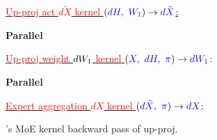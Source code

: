\begin{figure}
\vspace{-3em}
\begin{minipage}{0.35\textwidth}

\begin{algorithm}[H]
    \caption{\Algname's MoE kernel backward pass of up-proj.}
    \DontPrintSemicolon
    \label{alg:up-bwd-moe}
     \fontsize{8pt}{9pt}\selectfont
    
    
    
    \underline{\textcolor{red}{Up-proj act $d\tilde{X}$ kernel} $(\textcolor{blue}{dH, \ W_{1}}) \rightarrow \textcolor{blue}{d\tilde{X}}$:}  \;
    
    \;
    
    \Indp
    
    \textbf{Parallel} 
    
    \Indm
    \underline{\textcolor{red}{Up-proj weight $dW_{1}$ kernel} $(\textcolor{blue}{X, \ dH, \ \pi}) \rightarrow \textcolor{blue}{dW_{1}}$}:\;
    
    \;
    
    \Indp
    
    
    \textbf{Parallel} 
    
    \Indm
    \underline{\textcolor{red}{Expert aggregation $dX$ kernel} $(\textcolor{blue}{d\tilde{X}, \ \pi}) \rightarrow \textcolor{blue}{dX}$}: \;
    

\end{algorithm}
\end{minipage}
\end{figure}
